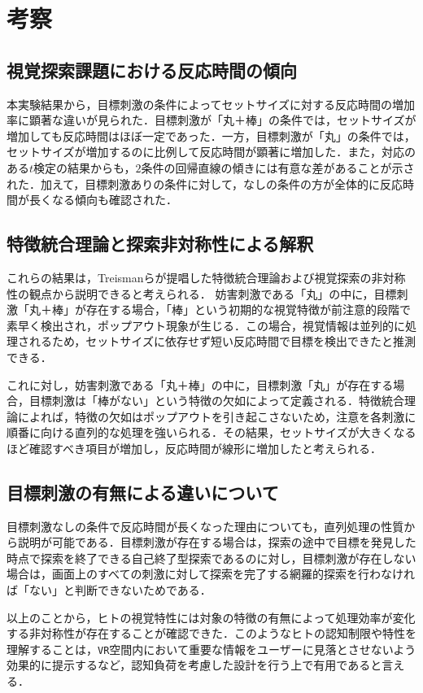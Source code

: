 \documentclass[paper=a4, fontsize=10pt]{jlreq}
\begin{document}
\section{考察}

\subsection{視覚探索課題における反応時間の傾向}
本実験結果から，目標刺激の条件によってセットサイズに対する反応時間の増加率に顕著な違いが見られた．目標刺激が「丸＋棒」の条件では，セットサイズが増加しても反応時間はほぼ一定であった．一方，目標刺激が「丸」の条件では，セットサイズが増加するのに比例して反応時間が顕著に増加した．また，対応のある$t$検定の結果からも，$2$条件の回帰直線の傾きには有意な差があることが示された．加えて，目標刺激ありの条件に対して，なしの条件の方が全体的に反応時間が長くなる傾向も確認された．

\subsection{特徴統合理論と探索非対称性による解釈}
これらの結果は，Treismanらが提唱した特徴統合理論\cite{bsd_attention}および視覚探索の非対称性の観点から説明できると考えられる．
妨害刺激である「丸」の中に，目標刺激「丸＋棒」が存在する場合，「棒」という初期的な視覚特徴が前注意的段階で素早く検出され，ポップアウト現象が生じる．この場合，視覚情報は並列的に処理されるため，セットサイズに依存せず短い反応時間で目標を検出できたと推測できる．

これに対し，妨害刺激である「丸＋棒」の中に，目標刺激「丸」が存在する場合，目標刺激は「棒がない」という特徴の欠如によって定義される．特徴統合理論によれば，特徴の欠如はポップアウトを引き起こさないため，注意を各刺激に順番に向ける直列的な処理を強いられる．その結果，セットサイズが大きくなるほど確認すべき項目が増加し，反応時間が線形に増加したと考えられる．

\subsection{目標刺激の有無による違いについて}
目標刺激なしの条件で反応時間が長くなった理由についても，直列処理の性質から説明が可能である．目標刺激が存在する場合は，探索の途中で目標を発見した時点で探索を終了できる自己終了型探索であるのに対し，目標刺激が存在しない場合は，画面上のすべての刺激に対して探索を完了する網羅的探索を行わなければ「ない」と判断できないためである．

以上のことから，ヒトの視覚特性には対象の特徴の有無によって処理効率が変化する非対称性が存在することが確認できた．このようなヒトの認知制限や特性を理解することは，\texttt{VR}空間内において重要な情報をユーザーに見落とさせないよう効果的に提示するなど，認知負荷を考慮した設計を行う上で有用であると言える．
\end{document}
